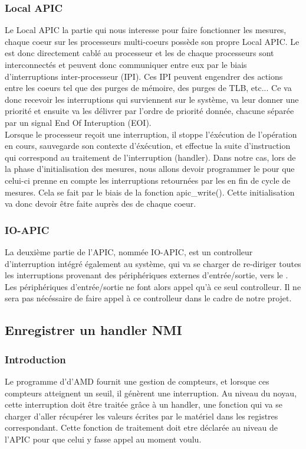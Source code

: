 					\subsubsection{Local APIC}
						Le Local APIC la partie qui nous interesse pour faire fonctionner les mesures, chaque coeur sur les processeurs multi-coeurs possède son propre Local APIC. Le \lap est donc directement cablé au processeur et les \lap de chaque processeurs sont interconnectés et peuvent donc communiquer entre eux par le biais d'interruptions inter-processeur (IPI). Ces IPI peuvent engendrer des actions entre les coeurs tel que des purges de mémoire, des purges de TLB, etc... Ce \lap va donc recevoir les interruptions qui surviennent sur le système, va leur donner une priorité et ensuite va les délivrer par l'ordre de priorité donnée, chacune séparée par un signal End Of Interuption (EOI). \\
					Lorsque le processeur reçoit une interruption, il stoppe l'éxécution de l'opération en cours, sauvegarde son contexte d'éxécution, et effectue la suite d'instruction qui correspond au traitement de l'interruption (handler). Dans notre cas, lors de la phase d'initialisation des mesures, nous allons devoir programmer le \lap pour que celui-ci prenne en compte les interruptions retournées par les \IBS en fin de cycle de mesures. Cela se fait par le biais de la fonction apic\_write(). Cette initialisation va donc devoir être faite auprès des \lap de chaque coeur.\\
					\subsubsection{IO-APIC}
						La deuxième partie de l'APIC, nommée IO-APIC, est un controlleur d'interruption intégré également au système, qui va se charger de re-diriger toutes les interruptions provenant des périphériques externes d'entrée/sortie, vers le \lap. Les périphériques d'entrée/sortie ne font alors appel qu'à ce seul controlleur. Il ne sera pas nécéssaire de faire appel à ce controlleur dans le cadre de notre projet.
				\subsection{Enregistrer un handler NMI}
					\subsubsection{Introduction}
						Le programme d'\IBS d'AMD fournit une gestion de compteurs, et lorsque ces compteurs atteignent un seuil, il génèrent une interruption. Au niveau du noyau, cette interruption doit être traitée grâce à un handler, une fonction qui va se charger d'aller récupérer les valeurs écrites par le matériel dans les registres correspondant. Cette fonction de traitement doit etre déclarée au niveau de l'APIC pour que celui y fasse appel au moment voulu.
